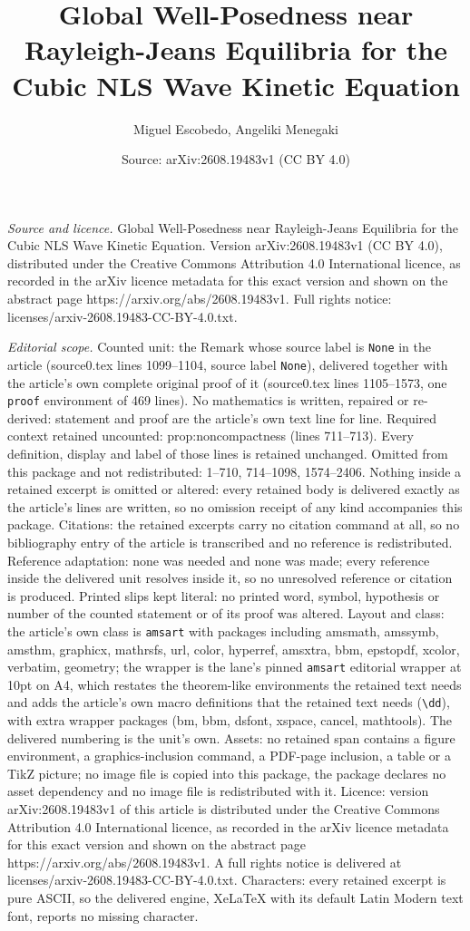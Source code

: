 \documentclass[10pt,a4paper]{amsart}
\title[Global Well-Posedness near Rayleigh-Jeans Equilibria for the]{Global Well-Posedness near Rayleigh-Jeans Equilibria for the Cubic NLS Wave Kinetic Equation}
\author{Miguel Escobedo, Angeliki Menegaki}
\date{Source: arXiv:2608.19483v1 (CC BY 4.0)}
\begin{document}
\maketitle

\noindent\emph{Source and licence.} Global Well-Posedness near Rayleigh-Jeans Equilibria for the Cubic NLS Wave Kinetic Equation. Version arXiv:2608.19483v1 (CC BY 4.0), distributed under the Creative Commons Attribution 4.0 International licence, as recorded in the arXiv licence metadata for this exact version and shown on the abstract page https://arxiv.org/abs/2608.19483v1. Full rights notice: licenses/arxiv-2608.19483-CC-BY-4.0.txt.\par\smallskip

\noindent\textit{Editorial scope.} Counted unit: the Remark whose source label is \texttt{None} in the article (source0.tex lines 1099--1104, source label \texttt{None}), delivered together with the article's own complete original proof of it (source0.tex lines 1105--1573, one \texttt{proof} environment of 469 lines). No mathematics is written, repaired or re-derived: statement and proof are the article's own text line for line. Required context retained uncounted: prop:noncompactness (lines 711--713). Every definition, display and label of those lines is retained unchanged. Omitted from this package and not redistributed: 1--710, 714--1098, 1574--2406. Nothing inside a retained excerpt is omitted or altered: every retained body is delivered exactly as the article's lines are written, so no omission receipt of any kind accompanies this package. Citations: the retained excerpts carry no citation command at all, so no bibliography entry of the article is transcribed and no reference is redistributed. Reference adaptation: none was needed and none was made; every reference inside the delivered unit resolves inside it, so no unresolved reference or citation is produced. Printed slips kept literal: no printed word, symbol, hypothesis or number of the counted statement or of its proof was altered. Layout and class: the article's own class is \texttt{amsart} with packages including amsmath, amssymb, amsthm, graphicx, mathrsfs, url, color, hyperref, amsxtra, bbm, epstopdf, xcolor, verbatim, geometry; the wrapper is the lane's pinned \texttt{amsart} editorial wrapper at 10pt on A4, which restates the theorem-like environments the retained text needs and adds the article's own macro definitions that the retained text needs (\texttt{\textbackslash dd}), with extra wrapper packages (bm, bbm, dsfont, xspace, cancel, mathtools). The delivered numbering is the unit's own. Assets: no retained span contains a figure environment, a graphics-inclusion command, a PDF-page inclusion, a table or a TikZ picture; no image file is copied into this package, the package declares no asset dependency and no image file is redistributed with it. Licence: version arXiv:2608.19483v1 of this article is distributed under the Creative Commons Attribution 4.0 International licence, as recorded in the arXiv licence metadata for this exact version and shown on the abstract page https://arxiv.org/abs/2608.19483v1. A full rights notice is delivered at licenses/arxiv-2608.19483-CC-BY-4.0.txt. Characters: every retained excerpt is pure ASCII, so the delivered engine, XeLaTeX with its default Latin Modern text font, reports no missing character.
\end{document}
